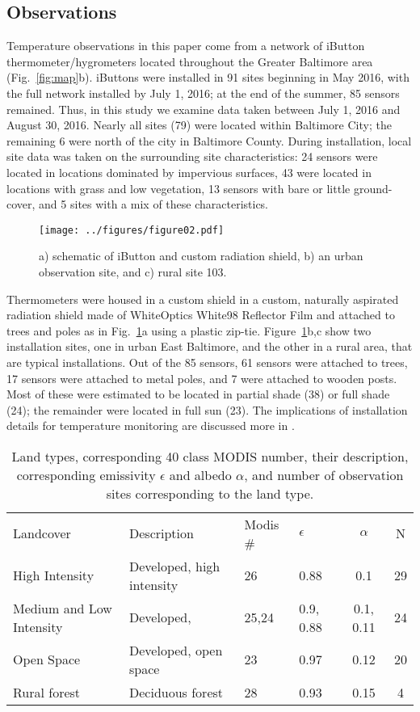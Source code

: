 \documentclass[draft,linenumbers]{agujournal}
\begin{document}
\subsection{Observations}
Temperature observations in this paper come from a network of iButton thermometer/hygrometers located throughout the Greater Baltimore area (Fig.~\ref{fig:map}b). 
iButtons were installed in 91 sites beginning in May 2016, with the full network installed by July 1, 2016; at the end of the summer, 85 sensors remained. Thus, in this study we examine data taken between July 1, 2016 and August 30, 2016. Nearly all sites (79) were located within Baltimore City; the remaining 6 were north of the city in Baltimore County. During installation, local site data was taken on the surrounding site characteristics: 24 sensors were located in locations dominated by impervious surfaces, 43 were located in locations with grass and low vegetation, 13 sensors with bare or little ground-cover, and 5 sites with a mix of these characteristics. 

 \begin{figure}
\centering
\texttt{[image: ../figures/figure02.pdf]}
\caption{a) schematic of iButton and custom radiation shield, b) an urban observation site, and c) rural site 103.}
\label{fig:ibutton}
 \end{figure}

Thermometers were housed in a custom shield in a custom, naturally aspirated radiation shield made of WhiteOptics White98 Reflector Film and attached to trees and poles as in Fig.~\ref{fig:ibutton}a using a plastic zip-tie. 
Figure~\ref{fig:ibutton}b,c show two installation sites, one in urban East Baltimore, and the other in a rural area, that are typical installations. 
Out of the 85 sensors, 61 sensors were attached to trees, 17 sensors were attached to metal poles, and 7 were attached to wooden posts. Most of these were estimated to be located in partial shade (38) or full shade (24); the remainder were located in full sun (23). The implications of installation details for temperature monitoring are discussed more in \cite{scott2017intraurban}.

\begin{table}
\centering
\begin{tabular}{l l l l c c}
Landcover & Description &  Modis \# & $\epsilon$ & $\alpha$ & N  \\
High Intensity & Developed, high intensity & 26& 0.88 &0.1 & 29 \\
Medium and Low Intensity & Developed, & 25,24& 0.9, 0.88 & 0.1, 0.11& 24\\
Open Space& Developed, open space &23 & 0.97 & 0.12 & 20\\
Rural forest&Deciduous forest & 28& 0.93& 0.15& 4\\
\end{tabular}
\caption{Land types, corresponding 40 class MODIS number, their description, corresponding emissivity $\epsilon$ and albedo $\alpha$, and number of observation sites corresponding to the land type.}
\label{tab:lcc}
\end{table}
\end{document}
